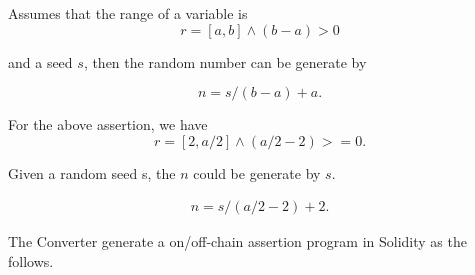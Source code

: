 \documentclass[runningheads]{llncs}
\begin{document}
Assumes that the range of a variable is 
\begin{displaymath}
r = [a, b] \land (b-a) > 0
\end{displaymath}

\noindent and a seed $s$, then the random number can be generate by 

\begin{displaymath}
n = s / (b - a) + a.
\end{displaymath}


\noindent For the above assertion, we have  
\begin{displaymath}
r = [2 , a / 2] \land (a / 2 - 2) >= 0. 
\end{displaymath}

\noindent Given a random seed s, the $n$ could be generate by $s$.

\begin{gather}
n = s / (a / 2 - 2) + 2.
\end{gather}



The Converter generate a on/off-chain assertion program in Solidity as the follows.
\end{document}
